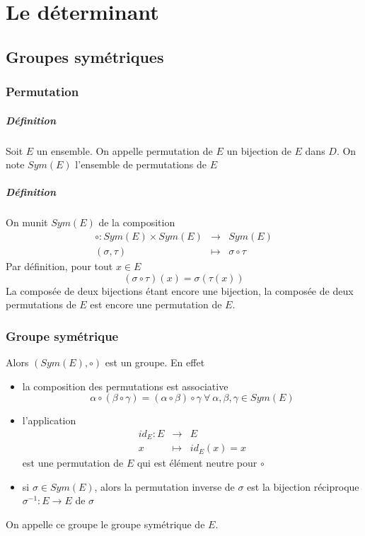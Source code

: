 \chapter{Le déterminant}

%
%
\section{Groupes symétriques}
%
%
%
\subsection{Permutation}
%
\paragraph{Définition} Soit $E$ un ensemble. On appelle permutation de $E$ un bijection  de $E$ dans $D$. On note $Sym(E)$ l'ensemble de permutations de $E$

\paragraph{Définition} On munit $Sym(E)$ de la composition
\begin{eqnarray*}
  \circ: Sym(E) \times Sym(E) &\rightarrow& Sym(E) \\
  (\sigma , \tau) &\mapsto& \sigma \circ \tau
\end{eqnarray*}
Par définition, pour tout $x\in E$
$$(\sigma \circ \tau)(x) = \sigma(\tau(x))$$
La composée de deux bijections étant encore une bijection, la composée de deux permutations de $E$ est encore une permutation de $E$.

%
\subsection{Groupe symétrique}
%
Alors $(Sym(E), \circ)$ est un groupe. En effet
\begin{itemize}
  \item la composition des permutations est associative
    $$\alpha \circ (\beta \circ \gamma) = (\alpha \circ \beta) \circ \gamma ~ \forall ~ \alpha, \beta, \gamma \in Sym(E)$$
  
  \item l'application
    \begin{eqnarray*}
      id_E: E &\rightarrow& E \\
      x &\mapsto& id_E(x) = x 
    \end{eqnarray*}
    est une permutation de $E$ qui est élément neutre pour $\circ$
    
  \item si $\sigma \in Sym(E)$, alors la permutation inverse de $\sigma$ est la bijection réciproque $\sigma^{-1}: E \rightarrow E$ de $\sigma$
\end{itemize}
On appelle ce groupe le groupe symétrique de $E$.

